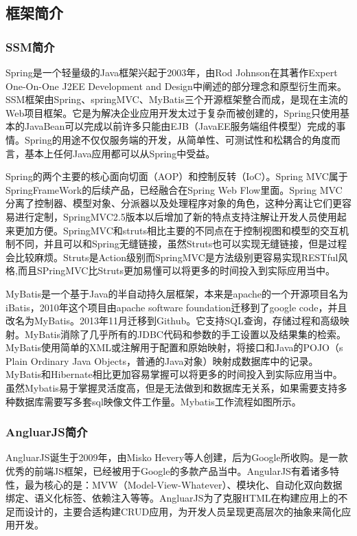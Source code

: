 \documentclass{husethesis}
\begin{document}
\subsection{框架简介}

\subsubsection{SSM简介}
Spring是一个轻量级的Java框架兴起于2003年，由Rod Johnson在其著作Expert One-On-One J2EE Development and Design中阐述的部分理念和原型衍生而来。SSM框架由Spring、springMVC、MyBatis三个开源框架整合而成，是现在主流的Web项目框架。它是为解决企业应用开发太过于复杂而被创建的，Spring只使用基本的JavaBean可以完成以前许多只能由EJB（JavaEE服务端组件模型）完成的事情\cite{ref3}。Spring的用途不仅仅服务端的开发，从简单性、可测试性和松耦合的角度而言，基本上任何Java应用都可以从Spring中受益。

Spring的两个主要的核心面向切面（AOP）和控制反转（IoC）。Spring MVC属于SpringFrameWork的后续产品，已经融合在Spring Web Flow里面\cite{ref4}。Spring MVC分离了控制器、模型对象、分派器以及处理程序对象的角色，这种分离让它们更容易进行定制，SpringMVC2.5版本以后增加了新的特点支持注解让开发人员使用起来更加方便。SpringMVC和struts相比主要的不同点在于控制视图和模型的交互机制不同，并且可以和Spring无缝链接，虽然Struts也可以实现无缝链接，但是过程会比较麻烦。Struts是Action级别而SpringMVC是方法级别更容易实现RESTful风格,而且SPringMVC比Struts更加易懂可以将更多的时间投入到实际应用当中\cite{ref5}。

MyBatis是一个基于Java的半自动持久层框架，本来是apache的一个开源项目名为iBatis，2010年这个项目由apache software foundation迁移到了google code，并且改名为MyBatis。2013年11月迁移到Github。它支持SQL查询，存储过程和高级映射。MyBatis消除了几乎所有的JDBC代码和参数的手工设置以及结果集的检索。MyBatis使用简单的XML或注解用于配置和原始映射，将接口和Java的POJO（s Plain Ordinary Java Objects，普通的Java对象）映射成数据库中的记录。MyBatis和Hibernate相比更加容易掌握可以将更多的时间投入到实际应用当中。虽然Mybatis易于掌握灵活度高，但是无法做到和数据库无关系，如果需要支持多种数据库需要写多套sql映像文件工作量\cite{ref6}。Mybatis工作流程如图所示。


\subsubsection{AngluarJS简介}
AngluarJS诞生于2009年，由Misko Hevery等人创建，后为Google所收购。是一款优秀的前端JS框架，已经被用于Google的多款产品当中。AngularJS有着诸多特性，最为核心的是：MVW（Model-View-Whatever）、模块化、自动化双向数据绑定、语义化标签、依赖注入等等\cite{ref7}。AngluarJS为了克服HTML在构建应用上的不足而设计的，主要合适构建CRUD应用，为开发人员呈现更高层次的抽象来简化应用开发。
\end{document}
